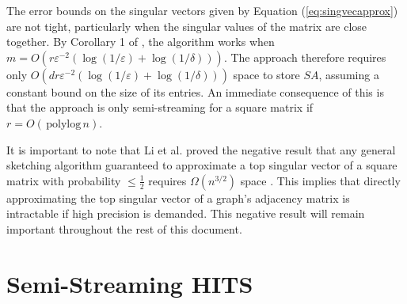 \documentclass{report}
\newcommand{\polylog}{\, \mathrm{polylog} \,}
\begin{document}
%
The error bounds on the singular vectors given by Equation (\ref{eq:singvecapprox}) are not tight, particularly when the singular values of the matrix are close together. 
By Corollary 1 of \cite{gilbert2012sketched}, the algorithm works when $m = O(r\varepsilon^{-2}(\log(1/\varepsilon) + \log(1/\delta)))$.
The approach therefore requires only $O(dr\varepsilon^{-2}(\log(1/\varepsilon) + \log(1/\delta)))$ space to store $SA$, assuming a constant bound on the size of its entries. 
An immediate consequence of this is that the approach is only semi-streaming for a square matrix if $r = O(\polylog n)$.

It is important to note that Li et al. proved the negative result that any general sketching algorithm guaranteed to approximate a top singular vector of a square matrix with probability $\leq \frac{1}{2}$ requires $\Omega(n^{3/2})$ space \cite{li2014sketching}. 
This implies that directly approximating the top singular vector of a graph's adjacency matrix is intractable if high precision is demanded. 
This negative result will remain important throughout the rest of this document.









\section{Semi-Streaming HITS} \label{hits:sec:sshits}
\end{document}
